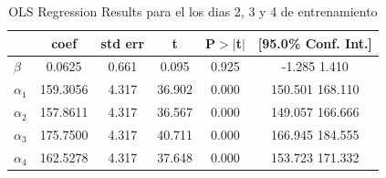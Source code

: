 \documentclass{article}
\begin{document}
\begin {table}

\begin{center}

\caption{OLS Regression Results para el los dias 2, 3 y 4 de entrenamiento}
\label{tabla:entrenamietoParteFinal}
\vspace{0.3in}


\begin{tabular}{lccccc}
            & \textbf{coef} & \textbf{std err} & \textbf{t} & \textbf{P$>|$t$|$} & \textbf{[95.0\% Conf. Int.]}  \\
\midrule
\textbf{$\beta$} &       0.0625  &        0.661     &     0.095  &         0.925        &        -1.285     1.410       \\
\textbf{$\alpha_1$} &     159.3056  &        4.317     &    36.902  &         0.000        &       150.501   168.110       \\
\textbf{$\alpha_2$} &     157.8611  &        4.317     &    36.567  &         0.000        &       149.057   166.666       \\
\textbf{$\alpha_3$} &     175.7500  &        4.317     &    40.711  &         0.000        &       166.945   184.555       \\
\textbf{$\alpha_4$} &     162.5278  &        4.317     &    37.648  &         0.000        &       153.723   171.332       \\
\bottomrule
\end{tabular}


\end{center}
\end{table}
\end{document}
